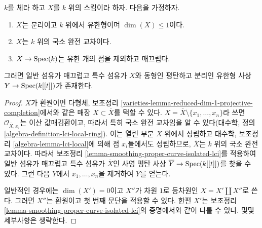 \begin{lemma}
\label{lemma-smoothing-curve-isolated-lci}
$k$를 체라 하고 $X$를 $k$ 위의 스킴이라 하자. 다음을 가정하자.
\begin{enumerate}
\item $X$는 분리이고 $k$ 위에서 유한형이며 $\dim(X) \leq 1$이다.
\item $X$는 $k$ 위의 국소 완전 교차이다.
\item $X \to \mathop{\mathrm{Spec}}(k)$는 유한 개의 점을 제외하고 매끄럽다.
\end{enumerate}
그러면 일반 섬유가 매끄럽고 특수 섬유가 $X$와 동형인 평탄하고 분리인
유한형 사상 $Y \to \mathop{\mathrm{Spec}}(k[[t]])$가 존재한다.
\end{lemma}

\begin{proof}
$X$가 환원이면 다형체, 보조정리
\ref{varieties-lemma-reduced-dim-1-projective-completion}에서와 같은 매장
$X \subset \overline{X}$를 택할 수 있다.
$X = \overline{X} \setminus \{x_1, \ldots, x_n\}$라 쓰면
$\mathcal{O}_{\overline{X}, x_i}$는 이산 값매김환이고, 따라서 특히 국소
완전 교차임을 알 수 있다(대수학, 정의
\ref{algebra-definition-lci-local-ring}). 이는 열린 부분 $X$ 위에서
성립하고 대수학, 보조정리 \ref{algebra-lemma-lci-local}에 의해 점 $x_i$들에서도
성립하므로, $\overline{X}$는 $k$ 위의 국소 완전 교차이다. 따라서 보조정리
\ref{lemma-smoothing-proper-curve-isolated-lci}를 적용하여 일반 섬유가
매끄럽고 특수 섬유가 $\overline{X}$인 사영 평탄 사상
$\overline{Y} \to \mathop{\mathrm{Spec}}(k[[t]])$를 찾을 수 있다. 그런 다음
$\overline{Y}$에서 $x_1, \ldots, x_n$을 제거하여 $Y$를 얻는다.

\medskip\noindent
일반적인 경우에는 $\dim(X') = 0$이고 $X''$가 차원 $1$로 등차원인
$X = X' \amalg X''$로 쓴다.%
그러면 $X''$는 환원이고 첫 번째 문단을 적용할 수 있다. 한편 $X'$는
보조정리 \ref{lemma-smoothing-proper-curve-isolated-lci}의 증명에서와 같이
다룰 수 있다. 몇몇 세부사항은 생략한다.
\end{proof}











